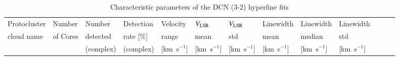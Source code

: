 \documentclass[longauth]{aa} %
\newcommand{\tdust}{\mbox{$T_{\rm dust}$}}
\newcommand{\vlsr}{\mbox{$V_{\rm LSR}$\,}}
\newcommand{\lbol}{\ensuremath{L_{\mathrm{bol}}\xspace}}        %
\begin{document}
\begin{table}[htbp!]
\centering
\begin{threeparttable}[c]
\caption{Characteristic parameters of the DCN (3-2) hyperfine fits}
\label{tab:dcnfits_average}
 \begin{tabular}{lllllllllllll}
\hline \noalign {\smallskip}
Protocluster         & Number\tnote{1}  & Number\tnote{2}   & Detection\tnote{2} & Velocity\tnote{3} & \vlsr\tnote{3}   & \vlsr\tnote{3}    & Linewidth\tnote{3}  & Linewidth\tnote{3}   &  Linewidth\tnote{3}  \\ 
cloud name & of Cores & detected    & rate [\%]   & range    & mean   & std     & mean  & median &  std \\
&  &(complex)        &  (complex)      & [km~s$^{-1}$]   & [km~s$^{-1}$] & [km~s$^{-1}$]  & [km~s$^{-1}$]& [km~s$^{-1}$] & [km~s$^{-1}$] \\


\end{tabular}
\end{threeparttable}
\end{table}
\end{document}
